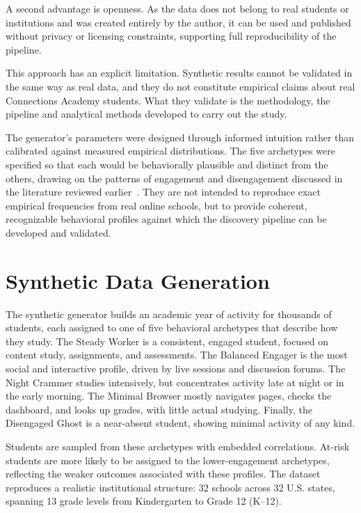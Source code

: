 A second advantage is openness. As the data does not belong to real students or institutions and was created entirely by the author, it can be used and published without privacy or licensing constraints, supporting full reproducibility of the pipeline.

This approach has an explicit limitation. Synthetic results cannot be validated in the same way as real data, and they do not constitute empirical claims about real Connections Academy students. What they validate is the methodology, the pipeline and analytical methods developed to carry out the study.

The generator's parameters were designed through informed intuition rather than calibrated against measured empirical distributions. The five archetypes were specified so that each would be behaviorally plausible and distinct from the others, drawing on the patterns of engagement and disengagement discussed in the literature reviewed earlier~\cite{fostering_curtis_2015, beck_atrisk_2024}. They are not intended to reproduce exact empirical frequencies from real online schools, but to provide coherent, recognizable behavioral profiles against which the discovery pipeline can be developed and validated.

\section{Synthetic Data Generation}
\label{sec:synthetic-data-generation}
The synthetic generator builds an academic year of activity for thousands of students, each assigned to one of five behavioral archetypes that describe how they study. The Steady Worker is a consistent, engaged student, focused on content study, assignments, and assessments. The Balanced Engager is the most social and interactive profile, driven by live sessions and discussion forums. The Night Crammer studies intensively, but concentrates activity late at night or in the early morning. The Minimal Browser mostly navigates pages, checks the dashboard, and looks up grades, with little actual studying. Finally, the Disengaged Ghost is a near-absent student, showing minimal activity of any kind.

Students are sampled from these archetypes with embedded correlations. At-risk students are more likely to be assigned to the lower-engagement archetypes, reflecting the weaker outcomes associated with these profiles. The dataset reproduces a realistic institutional structure: 32 schools across 32 U.S. states, spanning 13 grade levels from Kindergarten to Grade 12 (K--12).

